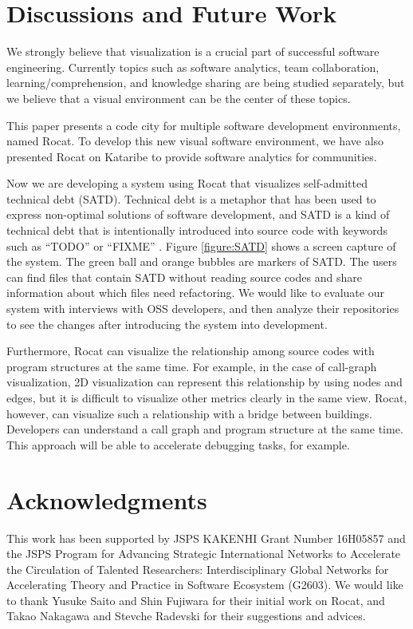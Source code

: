 \documentclass[conference]{IEEEtran}
\newcommand{\figref}[1]{Figure \ref{#1}}
\begin{document}
\section{Discussions and Future Work}
We strongly believe that visualization is a crucial part of successful software engineering. 
Currently topics such as software analytics, team collaboration, learning/comprehension, and knowledge sharing are being studied separately, but we believe that a visual environment can be the center of these topics.

This paper presents a code city for multiple software development environments, named \textsf{Rocat}.
To develop this new visual software environment, we have also presented \textsf{Rocat} on \textsf{Kataribe} to provide software analytics for communities.

Now we are developing a system using \textsf{Rocat} that visualizes self-admitted technical debt (SATD). 
Technical debt is a metaphor that has been used to express non-optimal solutions of software development, and SATD is a kind of technical debt that is intentionally introduced into source code with keywords such as ``TODO'' or ``FIXME'' \cite{6976075}.
\figref{figure:SATD} shows a screen capture of the system.
The green ball and orange bubbles are markers of SATD.
The users can find files that contain SATD without reading source codes and share information about which files need refactoring.
We would like to evaluate our system with interviews with OSS developers, and then analyze their repositories to see the changes after introducing the system into development.

Furthermore, \textsf{Rocat} can visualize the relationship among source codes with program structures at the same time.
For example, in the case of call-graph visualization, 2D visualization can represent this relationship by using nodes and edges, but it is difficult to visualize other metrics clearly in the same view. 
\textsf{Rocat}, however, can visualize such a relationship with a bridge between buildings. 
Developers can understand a call graph and program structure at the same time.
This approach will be able to accelerate debugging tasks, for example.


\section*{Acknowledgments}
This work has been supported by JSPS KAKENHI Grant Number 16H05857 and the JSPS Program for Advancing Strategic International Networks to Accelerate the Circulation of Talented Researchers: Interdisciplinary Global Networks for Accelerating Theory and Practice in Software Ecosystem (G2603).
We would like to thank Yusuke Saito and Shin Fujiwara for their initial work on \textsf{Rocat}, and Takao Nakagawa and Stevche Radevski for their suggestions and advices.





\end{document}

